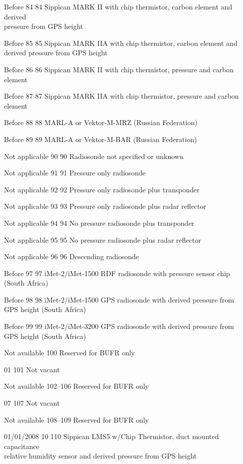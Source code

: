 Before 84 84 Sippican MARK II with chip thermistor, carbon element and derived\\
pressure from GPS height

Before 85 85 Sippican MARK IIA with chip thermistor, carbon element and\\
derived pressure from GPS height

Before 86 86 Sippican MARK II with chip thermistor, pressure and carbon\\
element

Before 87 87 Sippican MARK IIA with chip thermistor, pressure and carbon\\
element

Before 88 88 MARL-A or Vektor-M-MRZ (Russian Federation)

Before 89 89 MARL-A or Vektor-M-BAR (Russian Federation)

Not applicable 90 90 Radiosonde not specified or unknown

Not applicable 91 91 Pressure only radiosonde

Not applicable 92 92 Pressure only radiosonde plus transponder

Not applicable 93 93 Pressure only radiosonde plus radar reflector

Not applicable 94 94 No pressure radiosonde plus transponder

Not applicable 95 95 No pressure radiosonde plus radar reflector

Not applicable 96 96 Descending radiosonde

Before 97 97 iMet-2/iMet-1500 RDF radiosonde with pressure sensor chip\\
(South Africa)

Before 98 98 iMet-2/iMet-1500 GPS radiosonde with derived pressure from\\
GPS height (South Africa)

Before 99 99 iMet-2/iMet-3200 GPS radiosonde with derived pressure from\\
GPS height (South Africa)

Not available 100 Reserved for BUFR only

01 101 Not vacant

Not available 102--106 Reserved for BUFR only

07 107 Not vacant

Not available 108--109 Reserved for BUFR only

01/01/2008 10 110 Sippican LMS5 w/Chip Thermistor, duct mounted capacitance\\
relative humidity sensor and derived pressure from GPS height

